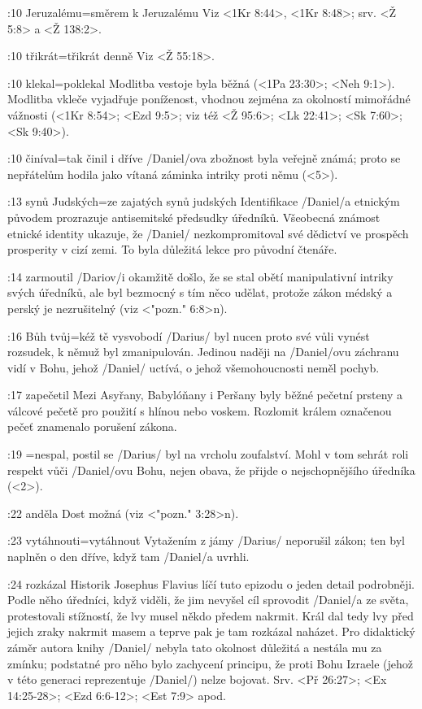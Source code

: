 :10 {Jeruzalému}={směrem k Jeruzalému} Viz <1Kr 8:44>, <1Kr 8:48>; srv. <Ž 5:8> a <Ž 138:2>.       

:10 {třikrát}={třikrát denně} Viz <Ž 55:18>.     

:10 {klekal}={poklekal} Modlitba vestoje byla běžná (<1Pa 23:30>; <Neh 9:1>).      
                               Modlitba vkleče vyjadřuje poníženost, vhodnou zejména za okolností mimořádné vážnosti 
                               (<1Kr 8:54>; <Ezd 9:5>; viz též <Ž 95:6>; <Lk 22:41>; <Sk 7:60>; <Sk 9:40>).     
                               
:10 {činíval}={tak činil i dříve} \x/Daniel/ova zbožnost byla veřejně známá; proto se nepřátelům hodila jako vítaná záminka intriky proti němu  (<5>).     

:13 {synů Judských}={ze zajatých synů judských} Identifikace \x/Daniel/a etnickým původem prozrazuje antisemitské předsudky úředníků. Všeobecná známost etnické identity ukazuje, že \x/Daniel/ nezkompromitoval své dědictví ve prospěch prosperity v cizí zemi. To byla důležitá lekce pro původní čtenáře. 

:14 {zarmoutil} \x/Dariov/i okamžitě došlo, že se stal obětí manipulativní  intriky svých  úředníků, ale byl bezmocný s tím něco udělat, protože zákon médský a perský je nezrušitelný (viz <"pozn." 6:8>n).     

:16 {Bůh tvůj}={kéž tě vysvobodí} \x/Darius/ byl nucen proto své vůli vynést rozsudek, k němuž byl zmanipulován. Jedinou naději na \x/Daniel/ovu záchranu vidí v Bohu, jehož \x/Daniel/ uctívá, o jehož všemohoucnosti neměl pochyb. %

:17 {zapečetil} Mezi Asyřany, Babylóňany i Peršany byly běžné pečetní prsteny a válcové pečetě pro použití s hlínou nebo voskem. Rozlomit králem označenou pečeť znamenalo porušení zákona.

:19 {}={nespal, postil se} \x/Darius/ byl na vrcholu zoufalství. Mohl v tom sehrát roli respekt vůči \x/Daniel/ovu Bohu, nejen obava, že přijde o nejschopnějšího úředníka (<2>).     

:22 {anděla}  Dost možná   (viz <"pozn." 3:28>n).

:23 {vytáhnouti}={vytáhnout} Vytažením z jámy \x/Darius/ neporušil zákon; ten byl naplněn o den dříve, když tam \x/Daniel/a uvrhli. 

:24 {rozkázal} Historik Josephus Flavius líčí tuto epizodu o jeden detail podrobněji. Podle něho úředníci, když viděli, že jim nevyšel cíl sprovodit \x/Daniel/a ze světa, protestovali stížností, že lvy musel někdo předem nakrmit. Král dal tedy lvy před jejich zraky nakrmit masem a teprve pak je tam rozkázal naházet. Pro didaktický záměr autora knihy \x/Daniel/ nebyla tato okolnost důležitá a nestála mu za zmínku; podstatné pro něho bylo zachycení principu, že proti Bohu Izraele (jehož v této generaci reprezentuje \x/Daniel/) nelze bojovat. Srv. <Př 26:27>;  <Ex 14:25-28>; <Ezd 6:6-12>;  <Est 7:9> apod. 

